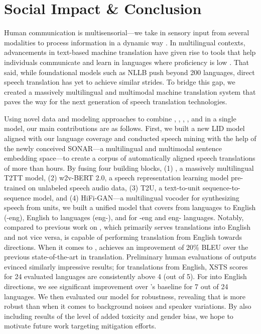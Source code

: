 \section{Social Impact \& Conclusion}
\label{sec:conclusion}


Human communication is multisensorial—we take in sensory input from several modalities to process information in a dynamic way \citep{holler2019multimodal}. In multilingual contexts, advancements in text-based machine translation have given rise to tools that help individuals communicate and learn in languages where proficiency is low \citep{lee2023effectiveness}. That said, while foundational models such as NLLB \citep{nllb2022} push \mt{} beyond 200 languages, direct speech translation has yet to achieve similar strides. To bridge this gap, we created a massively multilingual and multimodal machine translation system that paves the way for the next generation of speech translation technologies.

Using novel data and modeling approaches to combine \sst{}, \ttst{}, \st{}, \mt{}, and \asr{} in a single model, our main contributions are as follows. First, we built a new LID model aligned with our language coverage and conducted speech mining with the help of the newly conceived SONAR—a multilingual and multimodal sentence embedding space—to create a corpus of automatically aligned speech translations of more than \totalminedhours hours. By fusing four building blocks, (1) \nllbv, a massively multilingual T2TT model, (2) w2v-BERT 2.0, a speech
representation learning model pre-trained on unlabeled speech audio data, (3) T2U, a text-to-unit sequence-to-sequence model, and (4) HiFi-GAN—a multilingual vocoder for synthesizing
speech from units, we built a unified model that covers \sst{} from \nsslangs{} languages to English (\nsslangs{}-eng), English to \ntslangs{} languages (eng-\ntslangs{}), and \st{} for \nsslangs{}-eng and eng-\ntextlangs{} languages. Notably, compared to previous work on \sst{}, which primarily serves translations into English and not vice versa, \mfourt is capable of performing translation from English towards \ntslangs{} directions. When it comes to \st{}, \mfourt achieves an improvement of 20\% BLEU over the previous state-of-the-art in \st{} translation. Preliminary human evaluations of \st{} outputs evinced similarly impressive results; for translations from English, XSTS scores for 24 evaluated languages are consistently above 4 (out of 5). For into English directions, we see significant improvement over \whisperlarge's baseline for 7 out of 24 languages.
We then evaluated our model for robustness, revealing that \mfourt is more robust than \citep{whisper} when it comes to background noises and
speaker variations. By also including results of the level of added toxicity and gender bias, we hope to motivate future work targeting mitigation efforts.

